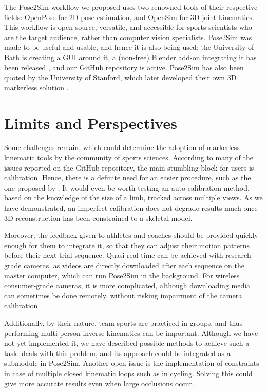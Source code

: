 The Pose2Sim workflow we proposed uses 
two renowned tools of their respective fields: OpenPose for 2D pose estimation, and OpenSim for 3D joint kinematics. This workflow is open-source, versatile, and accessible for sports scientists who are the target audience, rather than computer vision specialists. Pose2Sim was made to be useful and usable, and hence it is also being used: the University of Bath is creating a GUI around it, a (non-free) Blender add-on integrating it has been released \cite{Barreto2022}, and our GitHub repository is active. Pose2Sim has also been quoted by the University of Stanford, which later developed their own 3D markerless solution \cite{Uhlrich2022}. 



\section*{Limits and Perspectives}

Some challenges remain, which could determine the adoption of markerless kinematic tools by the community of sports sciences. According to many of the issues reported on the GitHub repository, the main stumbling block for users is calibration. Hence, there is a definite need for an easier procedure, such as the one proposed by \cite{Argus}. It would even be worth testing an auto-calibration method, based on the knowledge of the size of a limb, tracked across multiple views. As we have demonstrated, an imperfect calibration does not degrade results much once 3D reconstruction has been constrained to a skeletal model. 

Moreover, the feedback given to athletes and coaches should be provided quickly enough for them to integrate it, so that they can adjust their motion patterns before their next trial sequence. Quasi-real-time can be achieved with research-grade cameras, as videos are directly downloaded after each sequence on the master computer, which can run Pose2Sim in the background. For wireless consumer-grade cameras, it is more complicated, although downloading media can sometimes be done remotely, without risking impairment of the camera calibration. 

Additionally, by their nature, team sports are practiced in groups, and thus performing multi-person inverse kinematics can be important. Although we have not yet implemented it, we have described possible methods to achieve such a task. \cite{Easymocap2021} deals with this problem, and its approach could be integrated as a submodule in Pose2Sim. Another open issue is the implementation of constraints in case of multiple closed kinematic loops such as in cycling. Solving this could give more accurate results even when large occlusions occur.

